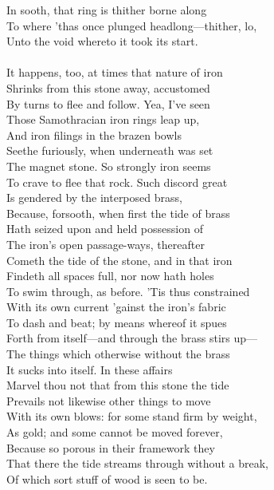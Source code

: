 In sooth, that ring is thither borne along\\
To where 'thas once plunged headlong—thither, lo,\\
Unto the void whereto it took its start.\\
\\
It happens, too, at times that nature of iron\\
Shrinks from this stone away, accustomed\\
By turns to flee and follow. Yea, I've seen\\
Those Samothracian iron rings leap up,\\
And iron filings in the brazen bowls\\
Seethe furiously, when underneath was set\\
The magnet stone. So strongly iron seems\\
To crave to flee that rock. Such discord great\\
Is gendered by the interposed brass,\\
Because, forsooth, when first the tide of brass\\
Hath seized upon and held possession of\\
The iron's open passage-ways, thereafter\\
Cometh the tide of the stone, and in that iron\\
Findeth all spaces full, nor now hath holes\\
To swim through, as before. 'Tis thus constrained\\
With its own current 'gainst the iron's fabric\\
To dash and beat; by means whereof it spues\\
Forth from itself—and through the brass stirs up—\\
The things which otherwise without the brass\\
It sucks into itself. In these affairs\\
Marvel thou not that from this stone the tide\\
Prevails not likewise other things to move\\
With its own blows: for some stand firm by weight,\\
As gold; and some cannot be moved forever,\\
Because so porous in their framework they\\
That there the tide streams through without a break,\\
Of which sort stuff of wood is seen to be.\\
